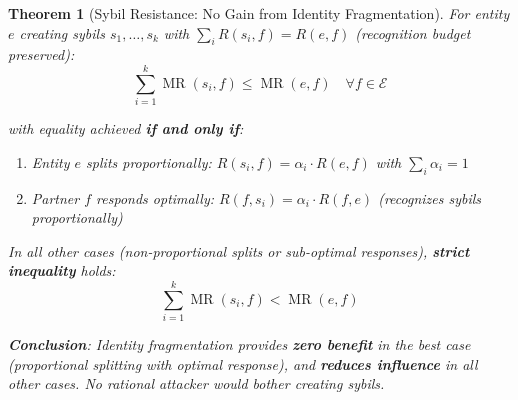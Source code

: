 \documentclass[11pt,a4paper]{article}
\newtheorem{theorem}{Theorem}[section]
\theoremstyle{definition}
\theoremstyle{remark}
\newcommand{\E}{\mathcal{E}}
\DeclareMathOperator{\MR}{MR}
\begin{document}
\begin{theorem}[Sybil Resistance: No Gain from Identity Fragmentation]
For entity $e$ creating sybils $s_1, \dots, s_k$ with $\sum_i R(s_i, f) = R(e,f)$ (recognition budget preserved):
\[ \sum_{i=1}^k \MR(s_i, f) \le \MR(e,f) \quad \forall f \in \E \]

with equality achieved \textbf{if and only if}:
\begin{enumerate}
\item Entity $e$ splits proportionally: $R(s_i, f) = \alpha_i \cdot R(e,f)$ with $\sum_i \alpha_i = 1$
\item Partner $f$ responds optimally: $R(f, s_i) = \alpha_i \cdot R(f,e)$ (recognizes sybils proportionally)
\end{enumerate}

In all other cases (non-proportional splits or sub-optimal responses), \textbf{strict inequality} holds:
\[ \sum_{i=1}^k \MR(s_i, f) < \MR(e,f) \]

\textbf{Conclusion}: Identity fragmentation provides \textbf{zero benefit} in the best case (proportional splitting with optimal response), and \textbf{reduces influence} in all other cases. No rational attacker would bother creating sybils.
\end{theorem}
\end{document}
